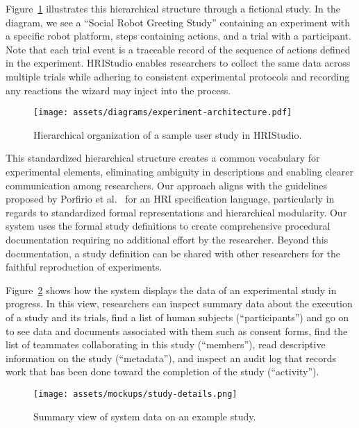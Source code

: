 \documentclass[letterpaper, 10 pt, conference]{subfiles/ieeeconf}
\begin{document}
Figure~\ref{fig:experiment-architecture} illustrates this hierarchical structure through a fictional study. In the diagram, we see a ``Social Robot Greeting Study'' containing an experiment with a specific robot platform, steps containing actions, and a trial with a participant. Note that each trial event is a traceable record of the sequence of actions defined in the experiment. HRIStudio enables researchers to collect the same data across multiple trials while adhering to consistent experimental protocols and recording any reactions the wizard may inject into the process.

\begin{figure}[ht]
    \centering
    \texttt{[image: assets/diagrams/experiment-architecture.pdf]}
    \caption{Hierarchical organization of a sample user study in HRIStudio.}
    \label{fig:experiment-architecture}
\end{figure}

This standardized hierarchical structure creates a common vocabulary for experimental elements, eliminating ambiguity in descriptions and enabling clearer communication among researchers. Our approach aligns with the guidelines proposed by Porfirio et al.~\cite{Porfirio2023} for an HRI specification language, particularly in regards to standardized formal representations and hierarchical modularity. Our system uses the formal study definitions to create comprehensive procedural documentation requiring no additional effort by the researcher. Beyond this documentation, a study definition can be shared with other researchers for the faithful reproduction of experiments.

Figure~\ref{fig:study-details} shows how the system displays the data of an experimental study in progress. In this view, researchers can inspect summary data about the execution of a study and its trials, find a list of human subjects (``participants'') and go on to see data and documents associated with them such as consent forms, find the list of teammates collaborating in this study (``members''), read descriptive information on the study (``metadata''), and inspect an audit log that records work that has been done toward the completion of the study (``activity'').  

\begin{figure}[t]
    \centering
\texttt{[image: assets/mockups/study-details.png]}
\caption{Summary view of system data on an example study.}
\label{fig:study-details}
\end{figure}
\end{document}
